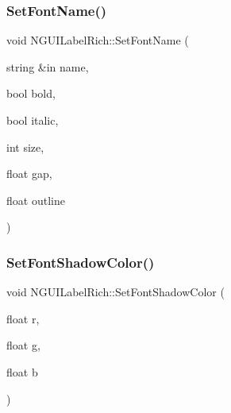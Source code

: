 \hypertarget{class_n_g_u_i_label_rich_af959af50ffe480587b0f11fc7ffbfdab}{}\label{class_n_g_u_i_label_rich_af959af50ffe480587b0f11fc7ffbfdab} 
\subsubsection{\texorpdfstring{Set\+Font\+Name()}{SetFontName()}}
{\footnotesize\ttfamily void N\+G\+U\+I\+Label\+Rich\+::\+Set\+Font\+Name (\begin{DoxyParamCaption}\item[{string \&in}]{name,  }\item[{bool}]{bold,  }\item[{bool}]{italic,  }\item[{int}]{size,  }\item[{float}]{gap,  }\item[{float}]{outline }\end{DoxyParamCaption})}

\hypertarget{class_n_g_u_i_label_rich_a69e0e1d2b6981300510793d4b0e819d3}{}\label{class_n_g_u_i_label_rich_a69e0e1d2b6981300510793d4b0e819d3} 
\subsubsection{\texorpdfstring{Set\+Font\+Shadow\+Color()}{SetFontShadowColor()}}
{\footnotesize\ttfamily void N\+G\+U\+I\+Label\+Rich\+::\+Set\+Font\+Shadow\+Color (\begin{DoxyParamCaption}\item[{float}]{r,  }\item[{float}]{g,  }\item[{float}]{b }\end{DoxyParamCaption})}

\hypertarget{class_n_g_u_i_label_rich_a3c61f1daf731fb1534634f41f75022fd}{}\label{class_n_g_u_i_label_rich_a3c61f1daf731fb1534634f41f75022fd} 
